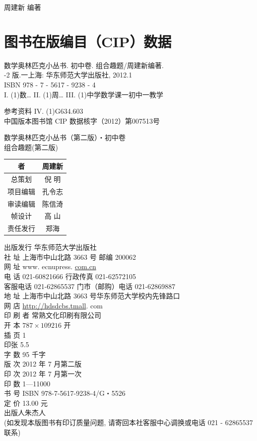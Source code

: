 \documentclass[10pt]{article}
\begin{document}
周建新 编著

\section{图书在版编目（CIP）数据}
数学奥林匹克小丛书. 初中卷. 组合趣题/周建新编著.\\
-2 版.一上海: 华东师范大学出版社, 2012.1\\
ISBN 978 - 7 - 5617 - 9238 - 4\\
I. (1)数… II. (1)周… III. (1)中学数学课一初中一教学

参考资料 IV. (1)G634.603\\
中国版本图书馆 CIP 数据核字（2012）第007513号

数学奥林匹克小丛书（第二版）・初中卷\\
组合趣题(第二版)

\begin{center}
\begin{tabular}{|c|c|}
\hline
者 & 周建新 \\
\hline
总策划 & 倪 明 \\
\hline
项目编辑 & 孔令志 \\
\hline
审读编辑 & 陈信渏 \\
\hline
帧设计 & 高 山 \\
\hline
责任发行 & 郑海 \\
\hline
\end{tabular}
\end{center}

出版发行 华东师范大学出版社\\
社 址 上海市中山北路 3663 号 邮编 200062\\
网 址 www. ecnupress. \href{http://com.cn}{com.cn}\\
电 话 021-60821666 行政传真 021-62572105\\
客服电话 021-62865537 门市（邮购）电话 021-62869887\\
地 址 上海市中山北路 3663 号华东师范大学校内先锋路口\\
网 店 \href{http://hdsdcbs.tmall}{http://hdsdcbs.tmall}. com\\
印 刷 者 常熟文化印刷有限公司\\
开 本 $787 \times 109216$ 开\\
插 页 1\\
印张 5.5\\
字 数 95 千字\\
版 次 2012 年 7 月第二版\\
印 次 2012 年 7 月第一次\\
印 数 1—11000\\
书 号 ISBN 978-7-5617-9238-4/G・5526\\
定 价 13.00 元\\
出版人朱杰人\\
(如发现本版图书有印订质量问题, 请寄回本社客服中心调换或电话 021 - 62865537联系)
\end{document}
